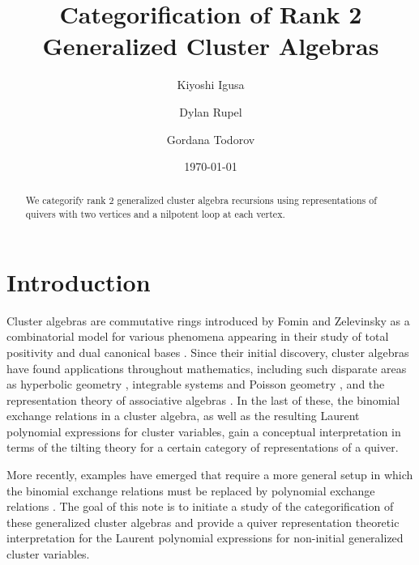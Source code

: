 \documentclass{amsart}
\title{Categorification of Rank 2 Generalized Cluster Algebras}
\author{Kiyoshi Igusa}
\author{Dylan Rupel}
\author{Gordana Todorov}
\date{\today}
\numberwithin{equation}{section}
\theoremstyle{definition}
\begin{document}
\begin{abstract}
  We categorify rank 2 generalized cluster algebra recursions using representations of quivers with two vertices and a nilpotent loop at each vertex.
\end{abstract}
 
\maketitle

\section{Introduction}

Cluster algebras are commutative rings introduced by Fomin and Zelevinsky \cite{fomin-zelevinsky1} as a combinatorial model for various phenomena appearing in their study of total positivity and dual canonical bases \cite{fomin-zelevinsky0}.  
Since their initial discovery, cluster algebras have found applications throughout mathematics, including such disparate areas as hyperbolic geometry \cite{fomin-shapiro-thurston}, integrable systems and Poisson geometry \cite{gekhtman-shapiro-vainshtein}, and the representation theory of associative algebras \cite{caldero-chapoton,bmrrt,caldero-keller}.  
In the last of these, the binomial exchange relations in a cluster algebra, as well as the resulting Laurent polynomial expressions for cluster variables, gain a conceptual interpretation in terms of the tilting theory for a certain category of representations of a quiver.

More recently, examples have emerged that require a more general setup in which the binomial exchange relations must be replaced by polynomial exchange relations \cite{chekhov-shapiro,gekhtman-shapiro-vainshtein2,iwaki-nakanishi}.  
The goal of this note is to initiate a study of the categorification of these generalized cluster algebras and provide a quiver representation theoretic interpretation for the Laurent polynomial expressions for non-initial generalized cluster variables.
\end{document}
